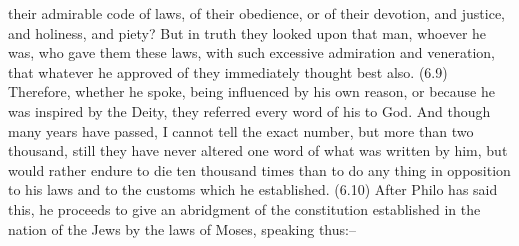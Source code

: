 their admirable code of laws, of their obedience, or of their devotion, and justice, and holiness, and
piety? But in truth they looked upon that man, whoever he was, who gave them these laws, with such
excessive admiration and veneration, that whatever he approved of they immediately thought best also.
(6.9) Therefore, whether he spoke, being influenced by his own reason, or because he was inspired by the
Deity, they referred every word of his to God. And though many years have passed, I cannot tell the
exact number, but more than two thousand, still they have never altered one word of what was written
by him, but would rather endure to die ten thousand times than to do any thing in opposition to his laws
and to the customs which he established. (6.10) After Philo has said this, he proceeds to give an
abridgment of the constitution established in the nation of the Jews by the laws of Moses, speaking
thus:--

